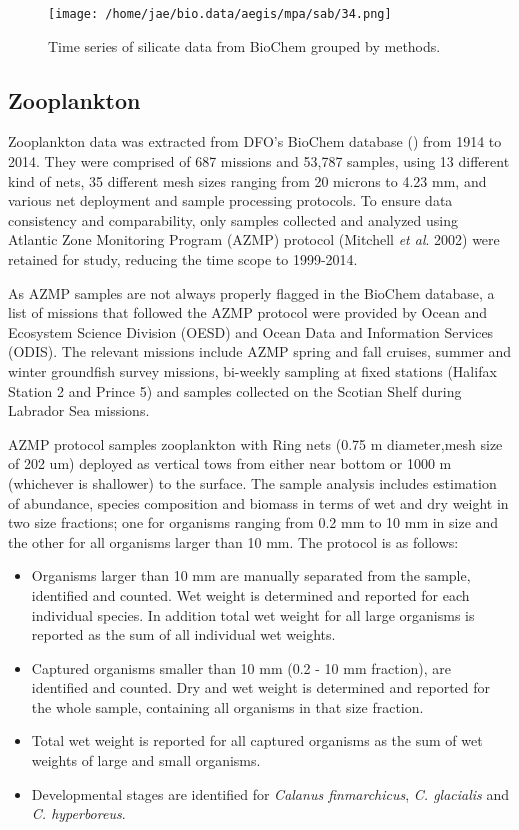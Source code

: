 \documentclass[letterpaper,portrait,11pt]{scrartcl}
\numberwithin{equation}{section}    %
\numberwithin{figure}{section}    %
\numberwithin{table}{section}       %
\begin{document}
\begin{appendices}
\begin{figure}[h]

  \centering
  \texttt{[image: /home/jae/bio.data/aegis/mpa/sab/34.png]}
  \caption{Time series of silicate data from BioChem grouped by methods.}
    \label{fig:silicateTimeseries}
\end{figure}



\afterpage{\clearpage}
\subsection{Zooplankton}

Zooplankton data was extracted from DFO's BioChem database (\cite{DFO:2014:biochem}) from 1914 to 2014. They were comprised of 687 missions and 53,787 samples, using 13 different kind of nets, 35 different mesh sizes ranging from 20 microns to 4.23 mm, and various net deployment and sample processing protocols. To ensure data consistency and comparability, only samples collected and analyzed using Atlantic Zone Monitoring Program (AZMP) protocol (Mitchell \textit{et al}. 2002) were retained for study, reducing the time scope to 1999-2014. 

As AZMP samples are not always properly flagged in the BioChem database, a list of missions that followed the AZMP protocol were provided by Ocean and Ecosystem Science Division (OESD) and Ocean Data and Information Services (ODIS). The relevant missions include AZMP spring and fall cruises, summer and winter groundfish survey missions, bi-weekly sampling at fixed stations (Halifax Station 2 and Prince 5) and samples collected on the Scotian Shelf during Labrador Sea missions. 

AZMP protocol samples zooplankton with Ring nets (0.75 m diameter,mesh size of 202 um) deployed as vertical tows from either near bottom or 1000 m (whichever is shallower) to the surface. The sample analysis includes estimation of abundance, species composition and biomass in terms of wet and dry weight in two size fractions; one for organisms ranging from 0.2 mm to 10 mm in size and the other for all organisms larger than 10 mm.  The protocol is as follows:

\begin{itemize}
  \item Organisms larger than 10 mm are manually separated from the sample, identified and counted. Wet weight is determined and reported for each individual species. In addition total wet weight for all large organisms is reported as the sum of all individual wet weights.
  \item Captured organisms smaller than 10 mm (0.2 - 10 mm fraction), are identified and counted. Dry and wet weight is determined and reported for the whole sample, containing all organisms in that size fraction.
  \item Total wet weight is reported for all captured organisms as the sum of wet weights of large and small organisms.
  \item Developmental stages are identified for \textit{Calanus finmarchicus}, \textit{C. glacialis} and \textit{C. hyperboreus}. 
\end{itemize}



\end{appendices}
\end{document}
